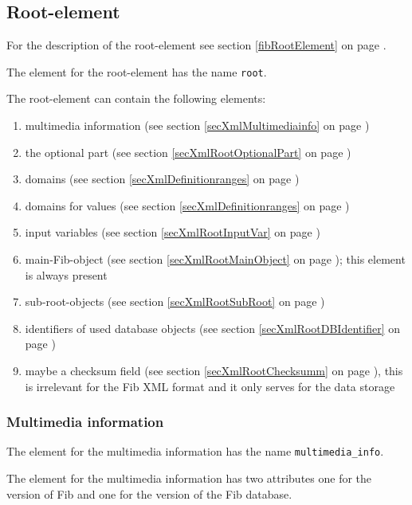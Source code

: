 \subsection{Root-element}
\label{secXmlRootElement}

For the description of the root-element see section \ref{fibRootElement} on page \pageref{fibRootElement} .

The element for the root-element has the name \verb|root|.

The root-element can contain the following elements:
\begin{enumerate}
 \item multimedia information (see section \ref{secXmlMultimediainfo} on page \pageref{secXmlMultimediainfo})
 \item the optional part (see section \ref{secXmlRootOptionalPart} on page \pageref{secXmlRootOptionalPart})
 \item domains (see section \ref{secXmlDefinitionranges} on page \pageref{secXmlDefinitionranges})
 \item domains for values (see section \ref{secXmlDefinitionranges} on page \pageref{secXmlDefinitionranges})
 \item input variables (see section \ref{secXmlRootInputVar} on page \pageref{secXmlRootInputVar})
 \item main-Fib-object (see section \ref{secXmlRootMainObject} on page \pageref{secXmlRootMainObject}); this element is always present
 \item sub-root-objects (see section \ref{secXmlRootSubRoot} on page \pageref{secXmlRootSubRoot})
 \item identifiers of used database objects (see section \ref{secXmlRootDBIdentifier} on page \pageref{secXmlRootDBIdentifier})
 \item maybe a checksum field (see section \ref{secXmlRootChecksumm} on page \pageref{secXmlRootChecksumm} ), this is irrelevant for the Fib XML format and it only serves for the data storage
\end{enumerate}


\subsubsection{Multimedia information}
\label{secXmlMultimediainfo}

The element for the multimedia information has the name \verb|multimedia_info|.

The element for the multimedia information has two attributes one for the version of Fib and one for the version of the Fib database.

